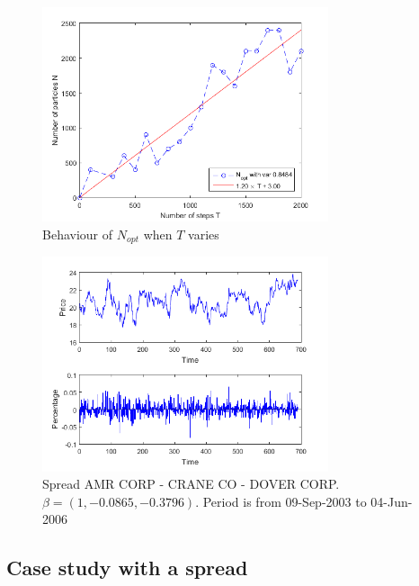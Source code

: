 \documentclass[11pt,a4,twosided,singlespacing,titlepagenumber=on]{scrreprt}
\numberwithin{equation}{chapter} %
\theoremstyle{remark}
\begin{document}
\begin{figure}[htb]
\centering
\includegraphics[width = 0.75\textwidth]{n_opt_function_t}
\caption{Behaviour of $N_{opt}$ when $T$ varies}
\label{n_opt_function_t}
\end{figure}

\begin{figure}[htb]
\centering
\includegraphics[width = 0.75\textwidth]{spread_amr_crane_2003_2006}
\caption{Spread AMR CORP - CRANE CO - DOVER CORP. $\beta = (1, -0.0865, -0.3796)$. Period is from 09-Sep-2003 to 04-Jun-2006}
\label{spread_amr_crane_2003_2006}
\end{figure}


\subsection{Case study with a spread}
\end{document}
